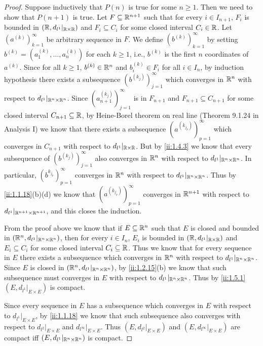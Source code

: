 \begin{proof}
  Suppose inductively that \(P(n)\) is true for some \(n \geq 1\).
  Then we need to show that \(P(n + 1)\) is true.
  Let \(F \subseteq \mathbb{R}^{n + 1}\) such that for every \(i \in I_{n + 1}\), \(F_i\) is bounded in \((\mathbb{R}, d_{l^1}|_{\mathbb{R} \times \mathbb{R}})\) and \(F_i \subseteq C_i\) for some closed interval \(C_i \in \mathbb{R}\).
  Let \((a^{(k)})_{k = 1}^\infty\) be arbitrary sequence in \(F\).
  We define \((b^{(k)})_{k = 1}^\infty\) by setting \(b^{(k)} = (a_1^{(k)}, \dots, a_n^{(k)})\) for each \(k \geq 1\), i.e., \(b^{(k)}\) is the first \(n\) coordinates of \(a^{(k)}\).
  Since for all \(k \geq 1\), \(b^{(k)} \in \mathbb{R}^n\) and \(b_i^{(k)} \in F_i\) for all \(i \in I_n\), by induction hypothesis there exists a subsequence \((b^{(k_j)})_{j = 1}^\infty\) which converges in \(\mathbb{R}^n\) with respect to \(d_{l^1}|_{\mathbb{R}^n \times \mathbb{R}^n}\).
  Since \((a_{n + 1}^{(k_j)})_{j = 1}^\infty\) is in \(F_{n + 1}\) and \(F_{n + 1} \subseteq C_{n + 1}\) for some closed interval \(C_{n + 1} \subseteq \mathbb{R}\), by Heine-Borel theorem on real line (Theorem 9.1.24 in Analysis I) we know that there exists a subsequence \((a^{(k_{j_p})})_{p = 1}^\infty\) which converges in \(C_{n + 1}\) with respect to \(d_{l^1}|_{\mathbb{R} \times \mathbb{R}}\).
  But by \cref{ii:1.4.3} we know that every subsequence of \((b^{(k_j)})_{j = 1}^\infty\) also converges in \(\mathbb{R}^n\) with respect to \(d_{l^1}|_{\mathbb{R}^n \times \mathbb{R}^n}\).
  In particular, \((b^{k_{j_p}})_{p = 1}^\infty\) converges in \(\mathbb{R}^n\) with respect to \(d_{l^1}|_{\mathbb{R}^n \times \mathbb{R}^n}\).
  Thus by \cref{ii:1.1.18}(b)(d) we know that \((a^{(k_{j_p})})_{p = 1}^\infty\) converges in \(\mathbb{R}^{n + 1}\) with respect to \(d_{l^1}|_{\mathbb{R}^{n + 1} \times \mathbb{R}^{n + 1}}\), and this closes the induction.

  From the proof above we know that if \(E \subseteq \mathbb{R}^n\) such that \(E\) is closed and bounded in \((\mathbb{R}^n, d_{l^1}|_{\mathbb{R}^n \times \mathbb{R}^n})\), then for every \(i \in I_n\), \(E_i\) is bounded in \((\mathbb{R}, d_{l^1}|_{\mathbb{R} \times \mathbb{R}})\) and \(E_i \subseteq C_i\) for some closed interval \(C_i \subseteq \mathbb{R}\).
  Thus we know that for every sequence in \(E\) there exists a subsequence which converges in \(\mathbb{R}^n\) with respect to \(d_{l^1}|_{\mathbb{R}^n \times \mathbb{R}^n}\).
  Since \(E\) is closed in \((\mathbb{R}^n, d_{l^1}|_{\mathbb{R}^n \times \mathbb{R}^n})\), by \cref{ii:1.2.15}(b) we know that such subsequence must converges in \(E\) with respect to \(d_{l^1}|_{\mathbb{R}^n \times \mathbb{R}^n}\).
  Thus by \cref{ii:1.5.1} \((E, d_{l^1}|_{E \times E})\) is compact.

  Since every sequence in \(E\) has a subsequence which converges in \(E\) with respect to \(d_{l^1}|_{E \times E}\), by \cref{ii:1.1.18} we know that such subsequence also converges with respect to \(d_{l^2}|_{E \times E}\) and \(d_{l^\infty}|_{E \times E}\).
  Thus \((E, d_{l^2}|_{E \times E})\) and \((E, d_{l^\infty}|_{E \times E})\) are compact iff \((E, d_{l^1}|_{\mathbb{R}^n \times \mathbb{R}^n})\) is compact.
\end{proof}

